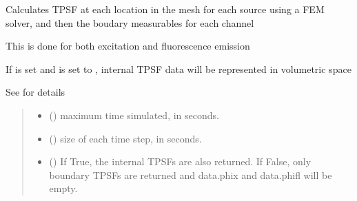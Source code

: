 \documentclass[letterpaper,10pt,english]{sphinxmanual}
\begin{document}
\begin{fulllineitems}
\begin{fulllineitems}
\label{\detokenize{_autosummary/nirfasterff.base.fluor_mesh.fluormesh:nirfasterff.base.fluor_mesh.fluormesh.femdata_tpsf}}
\pysigstartsignatures
\pysiglinewithargsret
{}
{\sphinxparamcomma {}\sphinxparamcomma {}\sphinxparamcomma {}\sphinxparamcomma {}\sphinxparamcomma {}}
{}
\pysigstopsignatures
\sphinxAtStartPar
Calculates TPSF at each location in the mesh for each source using a FEM solver, and then the boudary measurables for each channel

\sphinxAtStartPar
This is done for both excitation and fluorescence emission

\sphinxAtStartPar
If  is set and  is set to , internal TPSF data will be represented in volumetric space

\sphinxAtStartPar
See {\hyperref[\detokenize{_autosummary/nirfasterff.forward.femdata.femdata_fl_TR:nirfasterff.forward.femdata.femdata_fl_TR}]{}} for details
\begin{quote}\begin{description}
\begin{itemize}
\item {} 
\sphinxAtStartPar
{} () \textendash{} maximum time simulated, in seconds.

\item {} 
\sphinxAtStartPar
{} () \textendash{} size of each time step, in seconds.

\item {} 
\sphinxAtStartPar
{} (\sphinxstyleliteralemphasis{\sphinxupquote{, }}) \textendash{} 
\sphinxAtStartPar
If True, the internal TPSFs are also returned. If False, only boundary TPSFs are returned and data.phix and data.phifl will be empty.


\end{itemize}
\end{description}
\end{quote}
\end{fulllineitems}
\end{fulllineitems}
\end{document}
